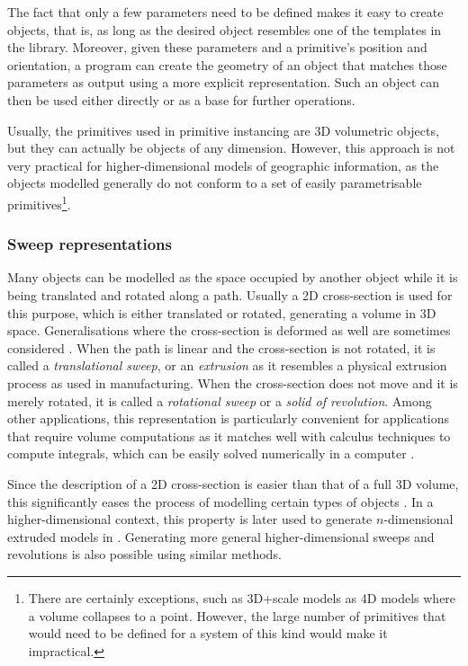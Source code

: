 The fact that only a few parameters need to be defined makes it easy to create objects, that is, as long as the desired object resembles one of the templates in the library.
Moreover, given these parameters and a primitive's position and orientation, a program can create the geometry of an object that matches those parameters as output using a more explicit representation.
Such an object can then be used either directly or as a base for further operations.

Usually, the primitives used in primitive instancing are 3D volumetric objects, but they can actually be objects of any dimension.
However, this approach is not very practical for higher-dimensional models of geographic information, as the objects modelled generally do not conform to a set of easily parametrisable primitives\footnote{There are certainly exceptions, such as 3D+scale models as 4D models where a volume collapses to a point.
However, the large number of primitives that would need to be defined for a system of this kind would make it impractical.}.

\subsubsection{Sweep representations}

Many objects can be modelled as the space occupied by another object while it is being translated and rotated along a path.
Usually a 2D cross-section is used for this purpose, which is either translated or rotated, generating a volume in 3D space.
Generalisations where the cross-section is deformed as well are sometimes considered \citep{Blackmore94}.
When the path is linear and the cross-section is not rotated, it is called a \emph{translational sweep}, or an \emph{extrusion} as it resembles a physical extrusion process as used in manufacturing.
When the cross-section does not move and it is merely rotated, it is called a \emph{rotational sweep} or a \emph{solid of revolution}.
Among other applications, this representation is particularly convenient for applications that require volume computations as it matches well with calculus techniques to compute integrals, which can be easily solved numerically in a computer \citep{Lee82}.

Since the description of a 2D cross-section is easier than that of a full 3D volume, this significantly eases the process of modelling certain types of objects \citep{Weld90}.
In a higher-dimensional context, this property is later used to generate $n$-dimensional extruded models in .
Generating more general higher-dimensional sweeps and revolutions is also possible using similar methods.

